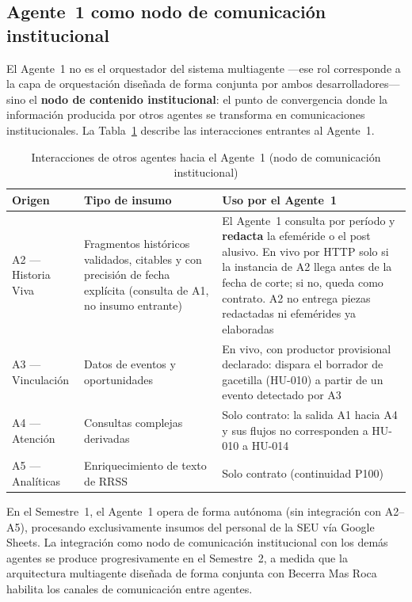 \documentclass[a4paper, 12pt]{article}
\begin{document}
\subsection{Agente~1 como nodo de comunicaci\'on institucional}

El Agente~1 no es el orquestador del sistema multiagente ---ese rol corresponde a la capa de orquestaci\'on dise\~nada de forma conjunta por ambos desarrolladores--- sino el \textbf{nodo de contenido institucional}: el punto de convergencia donde la informaci\'on producida por otros agentes se transforma en comunicaciones institucionales. La Tabla~\ref{tab:interacciones} describe las interacciones entrantes al Agente~1.

\begin{table}[H]
  \centering
  \caption{Interacciones de otros agentes hacia el Agente~1 (nodo de comunicaci\'on institucional)}
  \label{tab:interacciones}
  \begin{tabularx}{\textwidth}{ll>{\raggedright\arraybackslash}X}
    \toprule
    \textbf{Origen} & \textbf{Tipo de insumo} & \textbf{Uso por el Agente~1} \\
    \midrule
    A2 --- Historia Viva      & Fragmentos hist\'oricos validados, citables y con precisi\'on de fecha expl\'icita (consulta de A1, no insumo entrante) & El Agente~1 consulta por per\'iodo y \textbf{redacta} la efem\'eride o el post alusivo. En vivo por HTTP solo si la instancia de A2 llega antes de la fecha de corte; si no, queda como contrato. A2 no entrega piezas redactadas ni efem\'erides ya elaboradas \\
    A3 --- Vinculaci\'on      & Datos de eventos y oportunidades     & En vivo, con productor provisional declarado: dispara el borrador de gacetilla (HU-010) a partir de un evento detectado por A3 \\
    A4 --- Atenci\'on         & Consultas complejas derivadas & Solo contrato: la salida A1 hacia A4 y sus flujos no corresponden a HU-010 a HU-014 \\
    A5 --- Anal\'iticas       & Enriquecimiento de texto de \ac{RRSS} & Solo contrato (continuidad P100) \\
    \bottomrule
  \end{tabularx}
\end{table}

En el Semestre~1, el Agente~1 opera de forma aut\'onoma (sin integraci\'on con A2--A5), procesando exclusivamente insumos del personal de la \ac{SEU} v\'ia Google Sheets. La integraci\'on como nodo de comunicaci\'on institucional con los dem\'as agentes se produce progresivamente en el Semestre~2, a medida que la arquitectura multiagente dise\~nada de forma conjunta con Becerra Mas Roca habilita los canales de comunicaci\'on entre agentes.
\end{document}
